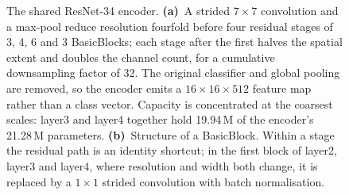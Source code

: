 \begin{figure}[htbp]
{}
\caption{The shared ResNet-34 encoder. \textbf{(a)}~A strided $7{\times}7$ convolution and a
max-pool reduce resolution fourfold before four residual stages of 3, 4, 6 and 3 BasicBlocks;
each stage after the first halves the spatial extent and doubles the channel count, for a
cumulative downsampling factor of 32. The original classifier and global pooling are removed, so
the encoder emits a $16{\times}16{\times}512$ feature map rather than a class vector. Capacity is
concentrated at the coarsest scales: layer3 and layer4 together hold 19.94\,M of the encoder's
21.28\,M parameters. \textbf{(b)}~Structure of a BasicBlock. Within a stage the residual path is
an identity shortcut; in the first block of layer2, layer3 and layer4, where resolution and width
both change, it is replaced by a $1{\times}1$ strided convolution with batch
normalisation.}\label{fig:encoder}
\end{figure}


